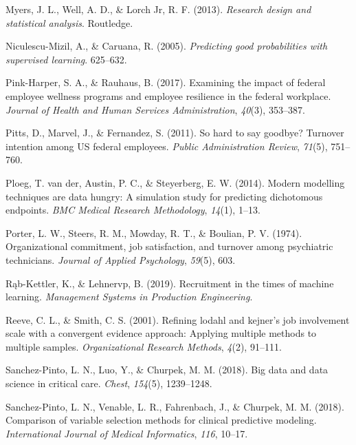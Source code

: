\documentclass[
  jou]{apa6}
\newlength{\cslhangindent}
\newlength{\cslentryspacingunit} %
\newenvironment{CSLReferences}[2] %
 {%
  \setlength{\parindent}{0pt}
  \ifodd #1
  \let\oldpar\par
  \def\par{\hangindent=\cslhangindent\oldpar}
  \fi
  \setlength{\parskip}{#2\cslentryspacingunit}
 }%
 {}
\begin{document}
\begin{CSLReferences}{1}{0}
\leavevmode{}%
Myers, J. L., Well, A. D., \& Lorch Jr, R. F. (2013). \emph{Research design and statistical analysis}. Routledge.

\leavevmode{}%
Niculescu-Mizil, A., \& Caruana, R. (2005). \emph{Predicting good probabilities with supervised learning}. 625--632.

\leavevmode{}%
Pink-Harper, S. A., \& Rauhaus, B. (2017). Examining the impact of federal employee wellness programs and employee resilience in the federal workplace. \emph{Journal of Health and Human Services Administration}, \emph{40}(3), 353--387.

\leavevmode{}%
Pitts, D., Marvel, J., \& Fernandez, S. (2011). So hard to say goodbye? Turnover intention among US federal employees. \emph{Public Administration Review}, \emph{71}(5), 751--760.

\leavevmode{}%
Ploeg, T. van der, Austin, P. C., \& Steyerberg, E. W. (2014). Modern modelling techniques are data hungry: A simulation study for predicting dichotomous endpoints. \emph{BMC Medical Research Methodology}, \emph{14}(1), 1--13.

\leavevmode{}%
Porter, L. W., Steers, R. M., Mowday, R. T., \& Boulian, P. V. (1974). Organizational commitment, job satisfaction, and turnover among psychiatric technicians. \emph{Journal of Applied Psychology}, \emph{59}(5), 603.

\leavevmode{}%
Rąb-Kettler, K., \& Lehnervp, B. (2019). Recruitment in the times of machine learning. \emph{Management Systems in Production Engineering}.

\leavevmode{}%
Reeve, C. L., \& Smith, C. S. (2001). Refining lodahl and kejner's job involvement scale with a convergent evidence approach: Applying multiple methods to multiple samples. \emph{Organizational Research Methods}, \emph{4}(2), 91--111.

\leavevmode{}%
Sanchez-Pinto, L. N., Luo, Y., \& Churpek, M. M. (2018). Big data and data science in critical care. \emph{Chest}, \emph{154}(5), 1239--1248.

\leavevmode{}%
Sanchez-Pinto, L. N., Venable, L. R., Fahrenbach, J., \& Churpek, M. M. (2018). Comparison of variable selection methods for clinical predictive modeling. \emph{International Journal of Medical Informatics}, \emph{116}, 10--17.


\end{CSLReferences}
\end{document}
